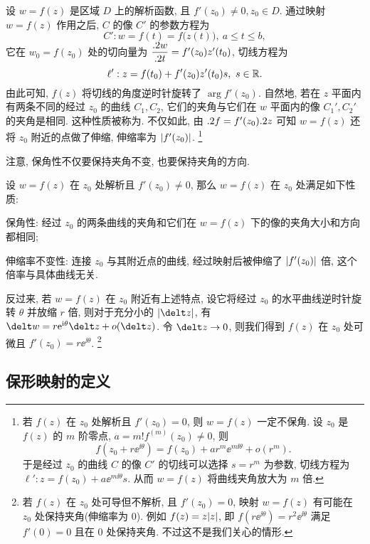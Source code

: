 设 $w=f(z)$ 是区域 $D$ 上的解析函数, 且 $f'(z_0)\neq 0,z_0\in D$.
通过映射 $w=f(z)$ 作用之后, $C$ 的像 $C'$ 的参数方程为
\[
  C':w=f(t)=f\bigl(z(t)\bigr),\ a\le t\le b,
\]
它在 $w_0=f(z_0)$ 处的切向量为 $\dfrac{.2 w}{.2 t}=f'(z_0) z'(t_0)$, 切线方程为
\[
  \ell': z=f(t_0)+f'(z_0) z'(t_0)s,\ s\in{\mathbb{R}}.
\]
由此可知, $f(z)$ 将切线的角度逆时针旋转了 $\arg f'(z_0)$.
自然地, 若在 $z$ 平面内有两条不同的经过 $z_0$ 的曲线 $C_1,C_2$, 它们的夹角与它们在 $w$ 平面内的像 $C_1',C_2'$ 的夹角是相同.
这种性质被称为.
不仅如此, 由 $.2 f=f'(z_0).2 z$ 可知 $w=f(z)$ 还将 $z_0$ 附近的点做了伸缩, 伸缩率为 $\lvert f'(z_0)\rvert$.
\footnote{
  若 $f(z)$ 在 $z_0$ 处解析且 $f'(z_0)=0$, 则 $w=f(z)$ 一定不保角.
  设 $z_0$ 是 $f(z)$ 的 $m$ 阶零点, $a=m!f^{(m)}(z_0)\neq 0$, 则
  \[
    f(z_0+r\ee^{\ii\theta})=f(z_0)+ar^m\ee^{m\ii\theta}+o(r^m).
  \]
  于是经过 $z_0$ 的曲线 $C$ 的像 $C'$ 的切线可以选择 $s=r^m$ 为参数, 切线方程为 $\ell':z=f(z_0)+a\ee^{m\ii\theta}s$.
  从而 $w=f(z)$ 将曲线夹角放大为 $m$ 倍.
} 

注意, \alert{保角性不仅要保持夹角不变, 也要保持夹角的方向.}

\begin{theorem}
  \label{thm:analytic-nonzero-coformal}
  设 $w=f(z)$ 在 $z_0$ 处解析且 $f'(z_0)\neq0$, 那么 $w=f(z)$ 在 $z_0$ 处满足如下性质:
  \begin{enuma}
    \item 保角性: 经过 $z_0$ 的两条曲线的夹角和它们在 $w=f(z)$ 下的像的夹角大小和方向都相同;
    \item 伸缩率不变性: 连接 $z_0$ 与其附近点的曲线, 经过映射后被伸缩了 $\lvert f'(z_0)\rvert$ 倍, 这个倍率与具体曲线无关.\footnotemark
  \end{enuma}
\end{theorem}

反过来, 若 $w=f(z)$ 在 $z_0$ 附近有上述特点, 设它将经过 $z_0$ 的水平曲线逆时针旋转 $\theta$ 并放缩 $r$ 倍, 则对于充分小的 $\abs{\delt z}$, 有 $\delt w=r\ee^{\ii\theta}\delt z+o(\delt z)$.
令 $\delt z\ra 0$, 则我们得到 $f(z)$ 在 $z_0$ 处可微且 $f'(z_0)=r\ee^{\ii\theta}$.
\footnote{
  若 $f(z)$ 在 $z_0$ 处可导但不解析, 且 $f'(z_0)=0$, 映射 $w=f(z)$ 有可能在 $z_0$ 处保持夹角(伸缩率为 $0$).
  例如 $f(z)=z\lvert z\rvert$, 即 $f(r\ee^{\ii\theta})=r^2\ee^{\ii\theta}$ 满足 $f'(0)=0$ 且在 $0$ 处保持夹角.
  不过这不是我们关心的情形.
}


\subsection{保形映射的定义}

